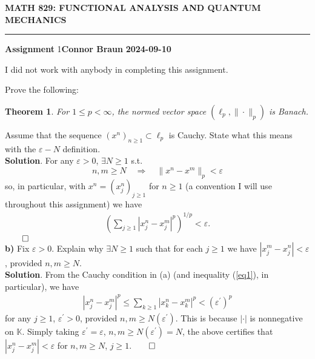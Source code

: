 \documentclass[10pt]{article}
\newcommand{\mbb}[1]{\mathbb{#1}}
\newcommand{\1}[1]{\mathbbm{1}_{#1}}
\newtheorem{theorem}{Theorem}
\begin{document}
    \begin{center}
        {\bf\large{MATH 829: FUNCTIONAL ANALYSIS AND QUANTUM MECHANICS}}
        \smallskip
        \hrule
        \smallskip
        {\bf Assignment} 1\hfill {\bf Connor Braun} \hfill {\bf 2024-09-10}
    \end{center}
    \vspace{5pt}
    \begin{center}
        \begin{minipage}{\dimexpr\paperwidth-10cm}
            I did not work with anybody in completing this assignment.
        \end{minipage}
    \end{center}
     Prove the following:
    \begin{theorem}
        For $1\leq p<\infty$, the normed vector space $(\ell_p,\|\cdot\|_p)$ is
        Banach.
    \end{theorem} 
     Assume that the sequence $(x^n)_{n\geq 1}\subset\ell_p$ is
    Cauchy. State what this means with the $\varepsilon-N$ definition.\\[5pt]
    {\bf Solution}. For any $\varepsilon>0$, $\exists N\geq 1$ s.t.
    \[n,m\geq N\quad\Rightarrow\quad \|x^n-x^m\|_p<\varepsilon\] so, in
    particular, with $x^n=(x^n_j)_{j\geq 1}$ for $n\geq 1$ (a convention I will
    use throughout this assignment) we have
    \begin{align}
        \left(\sum_{j\geq 1}|x^n_j-x^m_j|^p\right)^{1/p}<\varepsilon.\label{eq1}
    \end{align}
    \hfill{$\qed$}\\[5pt]
    {\bf b)} Fix $\varepsilon>0$. Explain why $\exists N\geq 1$ such that for
    each $j\geq 1$ we have $|x^m_j-x^n_j|<\varepsilon$, provided $n,m\geq
    N$.\\[5pt]
    {\bf Solution}. From the Cauchy condition in (a) (and inequality
    (\ref{eq1}), in particular), we have
    \begin{align}
        |x^n_j-x^m_j|^p\leq\sum_{k\geq1}|x^n_k-x^m_k|^p<(\varepsilon^\prime)^p\label{eq2}
    \end{align}
    for any $j\geq 1$, $\varepsilon^\prime>0$, provided $n,m\geq
    N(\varepsilon^\prime)$. This is because $|\cdot|$ is nonnegative on
    $\mbb{K}$. Simply taking $\varepsilon^\prime=\varepsilon$, $n,m\geq
    N(\varepsilon^\prime)=N$, the above certifies that
    $|x^n_j-x^m_j|<\varepsilon$ for $n,m\geq N$, $j\geq 1$.\hfill{$\qed$}\\[5pt]
\end{document}
